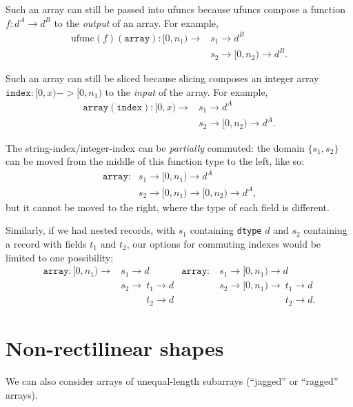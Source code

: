 \documentclass[12pt]{article}
\begin{document}
Such an array can still be passed into ufuncs because ufuncs compose a function $f: d^A \to d^B$ to the {\it output} of an array. For example,
\begin{align*}
\mbox{ufunc}(f)(\texttt{array}): [0, n_1) \to & s_1 \to d^B \\
 & s_2 \to [0, n_2) \to d^B\mbox{.}
\end{align*}

Such an array can still be sliced because slicing composes an integer array $\texttt{index}: [0, x) -> [0, n_1)$ to the {\it input} of the array. For example,
\begin{align*}
\texttt{array}(\texttt{index}): [0, x) \to & s_1 \to d^A \\
 & s_2 \to [0, n_2) \to d^A\mbox{.}
\end{align*}

The string-index/integer-index can be {\it partially} commuted: the domain $\{s_1, s_2\}$ can be moved from the middle of this function type to the left, like so:
\begin{align*}
\texttt{array}: & s_1 \to [0, n_1) \to d^A \\
& s_2 \to [0, n_1) \to [0, n_2) \to d^A\mbox{,}
\end{align*}
\noindent but it cannot be moved to the right, where the type of each field is different.

Similarly, if we had nested records, with $s_1$ containing \texttt{dtype} $d$ and $s_2$ containing a record with fields $t_1$ and $t_2$, our options for commuting indexes would be limited to one possibility:
\begin{align*}
\texttt{array}: [0, n_1) \to & s_1 \to d & \texttt{array}: &\ s_1 \to [0, n_1) \to d \\
 & {s_2 \to\ }t_1 \to d                              & &\ {s_2 \to [0, n_1) \to\ }t_1 \to d \\
 & \phantom{s_2 \to\ }t_2 \to d                      & &\ \phantom{s_2 \to [0, n_1) \to\ }t_2 \to d\mbox{.}
\end{align*}

\vfill

\section*{Non-rectilinear shapes}

We can also consider arrays of unequal-length subarrays (``jagged'' or ``ragged'' arrays).
\end{document}
